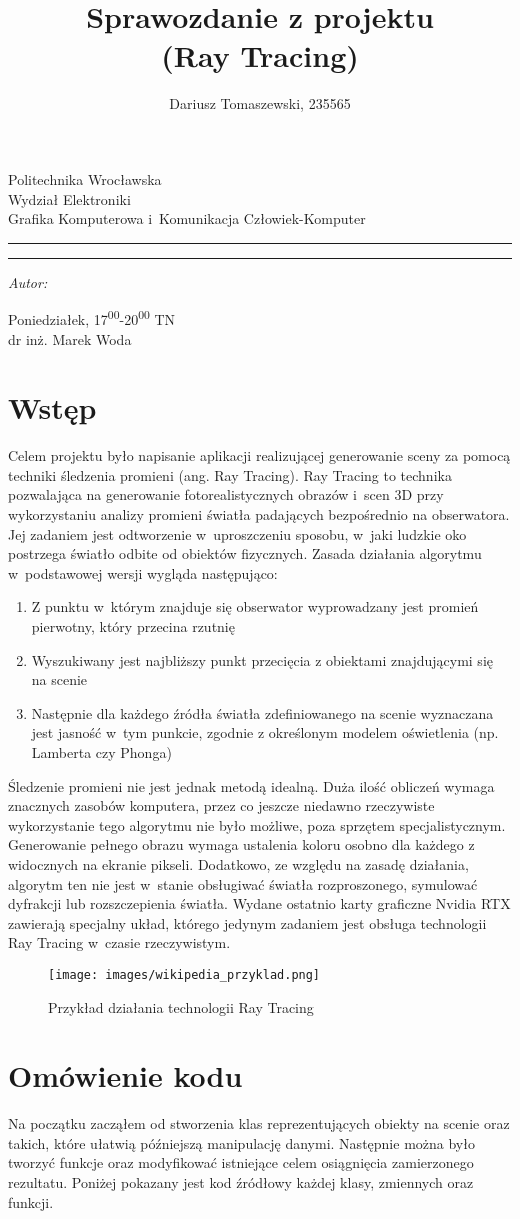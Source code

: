 \documentclass[11pt,a4paper,titlepage]{article}
\author{Dariusz Tomaszewski, 235565}
\title{Sprawozdanie z projektu\\
(Ray Tracing)}
\makeatletter
\newcommand{\linia}{\rule{\linewidth}{0.4mm}}
\renewcommand{\maketitle}{\begin{titlepage}
    \vspace*{1cm}
    \begin{center}\small
    Politechnika Wrocławska\\
    Wydział Elektroniki\\
    Grafika Komputerowa i~Komunikacja Człowiek-Komputer
    \end{center}
    \vspace{3cm}
    \noindent\linia
    \begin{center}
      \LARGE \textsc{\@title}
         \end{center}
     \linia
    \vspace{0.5cm}
    \begin{flushright}
    \begin{minipage}{7cm}
    \textit{\small Autor:}\\
    \normalsize \textsc{\@author} \par
    \end{minipage}
    \vspace{5cm}

     {\small Poniedziałek, 17\textsuperscript{00}-20\textsuperscript{00} TN}\\
        dr inż. Marek Woda
     \end{flushright}
    \vspace*{\stretch{6}}
    \begin{center}
    \@date
    \end{center}
  \end{titlepage}%
}
\makeatother
\begin{document}
\maketitle
\tableofcontents
\newpage

\section{Wstęp}
Celem projektu było napisanie aplikacji realizującej generowanie sceny za pomocą techniki śledzenia promieni (ang. Ray Tracing). Ray Tracing to technika pozwalająca na generowanie fotorealistycznych obrazów i~scen 3D przy wykorzystaniu analizy promieni światła padających bezpośrednio na obserwatora. Jej zadaniem jest odtworzenie w~uproszczeniu sposobu, w~jaki ludzkie oko postrzega światło odbite od obiektów fizycznych. Zasada działania
algorytmu w~podstawowej wersji wygląda następująco:
\begin{enumerate}
\item Z punktu w~którym znajduje się obserwator wyprowadzany jest promień pierwotny, który przecina rzutnię
\item  Wyszukiwany jest najbliższy punkt przecięcia z obiektami znajdującymi się na scenie
\item Następnie dla każdego źródła światła zdefiniowanego na scenie wyznaczana jest jasność w~tym punkcie, zgodnie z określonym modelem oświetlenia (np. Lamberta czy Phonga)
\end{enumerate}
Śledzenie promieni nie jest jednak metodą idealną. Duża ilość obliczeń wymaga znacznych zasobów komputera, przez co jeszcze niedawno rzeczywiste wykorzystanie tego algorytmu nie było możliwe, poza sprzętem specjalistycznym. Generowanie pełnego obrazu wymaga ustalenia koloru osobno dla każdego z widocznych na ekranie pikseli. Dodatkowo, ze względu na zasadę działania, algorytm ten nie jest w~stanie obsługiwać światła rozproszonego, symulować dyfrakcji lub rozszczepienia światła. 
\newline
Wydane ostatnio karty graficzne Nvidia RTX zawierają specjalny układ, którego jedynym zadaniem jest obsługa technologii Ray Tracing w~czasie rzeczywistym.
\begin{figure}[H]
\centering
\texttt{[image: images/wikipedia\_przyklad.png]}
\caption{Przykład działania technologii Ray Tracing}
\label{fig:eggWithLight}
\end{figure}

\newpage
\section{Omówienie kodu}
Na początku zacząłem od stworzenia klas reprezentujących obiekty na scenie oraz takich, które ułatwią późniejszą manipulację danymi. Następnie można było tworzyć funkcje oraz modyfikować istniejące celem osiągnięcia zamierzonego rezultatu. Poniżej pokazany jest kod źródłowy każdej klasy, zmiennych oraz funkcji.
\end{document}
